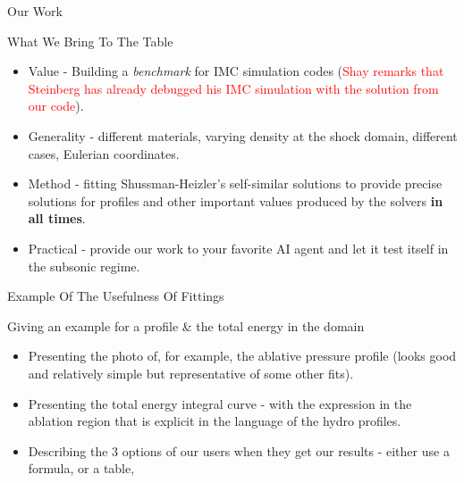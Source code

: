 \documentclass[presentation,10pt]{beamer}
\begin{document}
\begin{frame}{Our Work}
  \begin{block}{What We Bring To The Table}
    \begin{itemize}
      \item Value - Building a \textit{benchmark} for IMC simulation codes (\textcolor{red}{Shay remarks that Steinberg has already debugged his IMC simulation with the solution from our code}).
      \item Generality - different materials, varying density at the shock domain, different cases, Eulerian coordinates.
      \item Method - fitting Shussman-Heizler's self-similar solutions to provide precise solutions for profiles and other important values produced by the solvers \textbf{in all times}.
      \item Practical - provide our work to your favorite AI agent and let it test itself in the subsonic regime. 
    \end{itemize}
  \end{block}
\end{frame}


\begin{frame}{Example Of The Usefulness Of Fittings}
  \begin{block}{Giving an example for a profile \& the total energy in the domain}
    \begin{itemize}
      \item Presenting the photo of, for example, the ablative pressure profile (looks good and relatively simple but representative of some other fits).
      \item Presenting the total energy integral curve - with the expression in the ablation region that is explicit in the language of the hydro profiles.
      \item Describing the 3 options of our users when they get our results - either use a formula, or a table, 
    \end{itemize}
  \end{block}
\end{frame}
\end{document}
